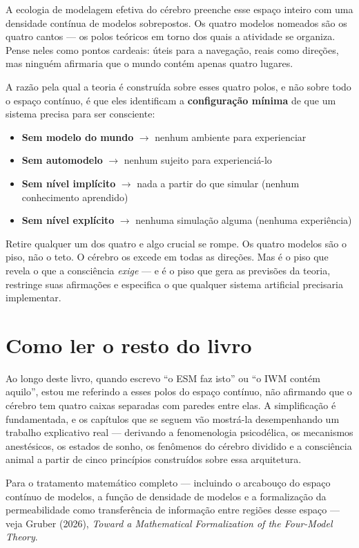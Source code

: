 \documentclass[11pt, twoside, openright]{book}
\begin{document}
A ecologia de modelagem efetiva do cérebro preenche esse espaço inteiro com uma densidade contínua de modelos sobrepostos. Os quatro modelos nomeados são os quatro cantos --- os polos teóricos em torno dos quais a atividade se organiza. Pense neles como pontos cardeais: úteis para a navegação, reais como direções, mas ninguém afirmaria que o mundo contém apenas quatro lugares.

A razão pela qual a teoria é construída sobre esses quatro polos, e não sobre todo o espaço contínuo, é que eles identificam a \textbf{configuração mínima} de que um sistema precisa para ser consciente:

\begin{itemize}
  \item \textbf{Sem modelo do mundo} $\rightarrow$ nenhum ambiente para experienciar
  \item \textbf{Sem automodelo} $\rightarrow$ nenhum sujeito para experienciá-lo
  \item \textbf{Sem nível implícito} $\rightarrow$ nada a partir do que simular (nenhum conhecimento aprendido)
  \item \textbf{Sem nível explícito} $\rightarrow$ nenhuma simulação alguma (nenhuma experiência)
\end{itemize}

Retire qualquer um dos quatro e algo crucial se rompe. Os quatro modelos são o piso, não o teto. O cérebro os excede em todas as direções. Mas é o piso que revela o que a consciência \textit{exige} --- e é o piso que gera as previsões da teoria, restringe suas afirmações e especifica o que qualquer sistema artificial precisaria implementar.

\section*{Como ler o resto do livro}

Ao longo deste livro, quando escrevo ``o ESM faz isto'' ou ``o IWM contém aquilo'', estou me referindo a esses polos do espaço contínuo, não afirmando que o cérebro tem quatro caixas separadas com paredes entre elas. A simplificação é fundamentada, e os capítulos que se seguem vão mostrá-la desempenhando um trabalho explicativo real --- derivando a fenomenologia psicodélica, os mecanismos anestésicos, os estados de sonho, os fenômenos do cérebro dividido e a consciência animal a partir de cinco princípios construídos sobre essa arquitetura.

Para o tratamento matemático completo --- incluindo o arcabouço do espaço contínuo de modelos, a função de densidade de modelos e a formalização da permeabilidade como transferência de informação entre regiões desse espaço --- veja Gruber (2026), \textit{Toward a Mathematical Formalization of the Four-Model Theory}.
\end{document}
